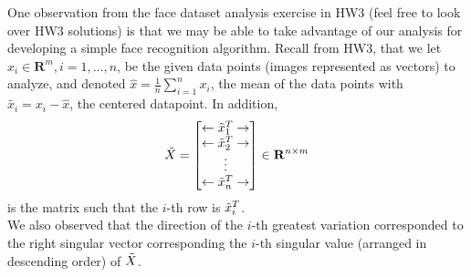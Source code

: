 \newline
One observation from the face dataset analysis exercise in HW3 (feel free to look over HW3 solutions) is that we may be able to take advantage of our analysis for developing a simple face recognition algorithm.  Recall from HW3, that  we 
let $x_i \in \mathbf{R}^m, i = 1, \hdots, n$, be the given data points (images represented as vectors) to analyze, and denoted $\hat{x} =  \frac{1}{n}\sum_{i =1}^{n} x_i $, the mean of the data points with $ \tilde{x_i} = x_i - \hat{x}$, the centered datapoint. In addition, 
\begin{equation*}
\Tilde{X} = 
\begin{bmatrix}
    \leftarrow \tilde{x}_1^T \rightarrow \\
    \leftarrow \tilde{x}_2^T \rightarrow \\
    \vdots       \\
    \leftarrow \tilde{x}_n^T \rightarrow
\end{bmatrix}
\in \mathbf{R}^{n \times m}
\end{equation*}
is the matrix such that the $i$-th row is $\Tilde{x}_i^T$.
\\

We also observed that the direction of the $i$-th greatest variation corresponded to the 
right singular vector corresponding the $i$-th singular value (arranged in descending order) of $\Tilde{X}$. 

